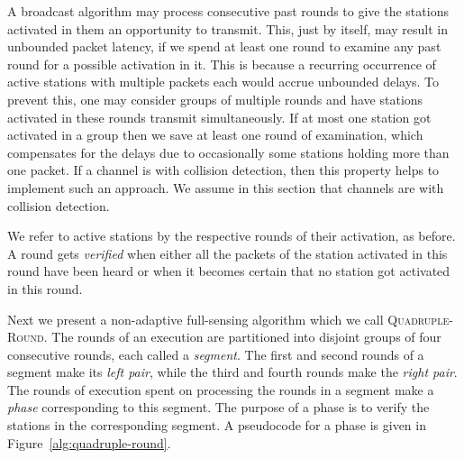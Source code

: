 \documentclass[11pt]{article}
\begin{document}
A broadcast algorithm may process consecutive past rounds to give the stations activated in them an opportunity to transmit.
This, just by itself, may result in unbounded packet latency, if we spend at least one round to examine any past round for a possible activation in it.
This is because a recurring occurrence of active stations with multiple packets each would accrue unbounded delays.
To prevent this, one may consider groups of multiple rounds and have stations activated in these rounds transmit simultaneously. 
If at most one station got activated in a group then we save at least one round of examination, which compensates for the delays due to occasionally some stations holding more than one packet.
If a channel is with collision detection, then this property helps to implement such an approach.
We assume in this section that channels are with collision detection.


We refer to active stations by the respective rounds of their activation, as before.
A round gets \emph{verified} when either all the packets of the station activated in this round have been heard or when it becomes certain that no station got activated in this round.


Next we present a non-adaptive full-sensing algorithm which we call \textsc{Quadruple-Round}.
The rounds of an execution are partitioned into disjoint groups of four consecutive rounds, each called a \emph{segment}.
The first and second rounds of a segment make its \emph{left pair}, while the third and fourth rounds make the \emph{right pair}.
The rounds of execution spent on processing the rounds in a segment make a  \emph{phase} corresponding to this segment.
The purpose of a phase is to verify the stations in the corresponding segment.
A pseudocode for a phase is given in Figure~\ref{alg:quadruple-round}.
\end{document}
